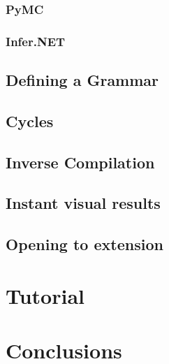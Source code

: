 \subsubsection{PyMC}

\subsubsection{Infer.NET}

\subsection{Defining a Grammar}

\subsection{Cycles}

\subsection{Inverse Compilation}

\subsection{Instant visual results}

\subsection{Opening to extension}

\section{Tutorial}

\section{Conclusions}
